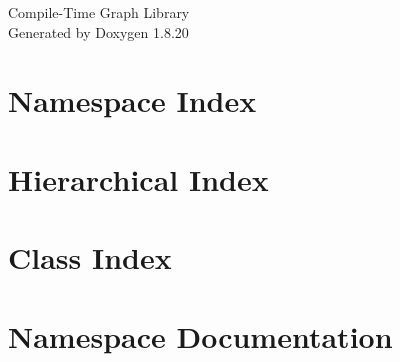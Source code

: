\let\mypdfximage\pdfximage\def\pdfximage{\immediate\mypdfximage}\documentclass[twoside]{book}
\newcommand{\+}{\discretionary{\mbox{\scriptsize$\hookleftarrow$}}{}{}}
\newcommand{\clearemptydoublepage}{%
  \newpage{\pagestyle{empty}\cleardoublepage}%
}
\begin{document}
\hypersetup{pageanchor=false,
             bookmarksnumbered=true,
             pdfencoding=unicode
            }
\begin{titlepage}
\vspace*{7cm}
\begin{center}%
{\Large Compile-\/\+Time Graph Library }\\
\vspace*{1cm}
{\large Generated by Doxygen 1.8.20}\\
\end{center}
\end{titlepage}
\clearemptydoublepage
{}
\tableofcontents
\clearemptydoublepage
{}
\hypersetup{pageanchor=true}

\chapter{Namespace Index}

\chapter{Hierarchical Index}

\chapter{Class Index}

\chapter{Namespace Documentation}



\end{document}
